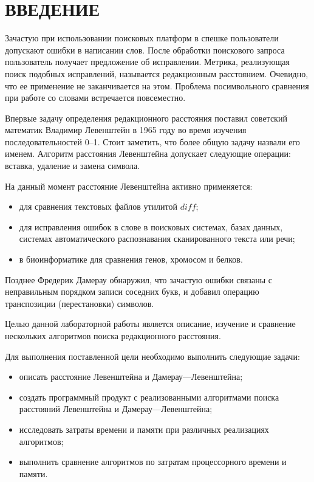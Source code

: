 \chapter*{ВВЕДЕНИЕ}

Зачастую при использовании поисковых платформ в спешке пользователи допускают ошибки в написании слов. 
После обработки поискового запроса пользователь получает предложение об исправлении.
Метрика, реализующая поиск подобных исправлений, называется редакционным расстоянием.  
Очевидно, что ее применение не заканчивается на этом. 
Проблема посимвольного сравнения при работе со словами встречается повсеместно.

Впервые задачу определения редакционного расстояния поставил советский математик Владимир Левенштейн в 1965 году во время изучения последовательностей 0--1. 
Стоит заметить, что более общую задачу назвали его именем. 
Алгоритм расстояния Левенштейна допускает следующие операции: вставка, удаление и замена символа.

На данный момент расстояние Левенштейна активно применяется:
\begin{itemize}
	\item для сравнения текстовых файлов утилитой ${diff}$;
	\item для исправления ошибок в слове в поисковых системах, базах данных, системах автоматического распознавания сканированного текста или речи;
	\item в биоинформатике для сравнения генов, хромосом и белков.
\end{itemize}

Позднее Фредерик Дамерау обнаружил, что зачастую ошибки связаны с неправильным порядком записи соседних букв, и добавил операцию транспозиции (перестановки) символов.

Целью данной лабораторной работы является описание, изучение и сравнение нескольких алгоритмов поиска редакционного расстояния.

Для выполнения поставленной цели необходимо выполнить следующие задачи:
\begin{itemize}
	\item описать расстояние Левенштейна и Дамерау---Левенштейна;
	\item создать программный продукт с реализованными алгоритмами поиска расстояний Левенштейна и Дамерау---Левенштейна;
	\item исследовать затраты времени и памяти при различных реализациях алгоритмов;
	\item выполнить сравнение алгоритмов по затратам процессорного времени и памяти.
\end{itemize}

